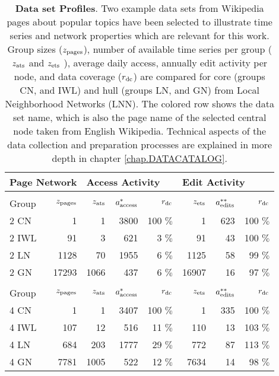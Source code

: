 \documentclass[a4paper,10pt]{scrbook}
\begin{document}
\begin{table}[h!]
 \begin{tabular}{|l|r||r|r|r||r|r|r|}
\hline
\multicolumn{2}{|l||}{\textbf{Page Network} } & \multicolumn{3}{l||}{\textbf{Access Activity}} & \multicolumn{3}{l|}{\textbf{Edit Activity}}  \\
\hline
\rowcolor{Yellow}
\multicolumn{8}{|c|}{\textbf{Formula One}} \\
\hline 
Group & $z_{\rm pages}$ & $ z_{\rm ats}$ & $a_{\rm access}^{\ast}$  & $r_{\rm dc}$ & $ z_{\rm ets}$ & $a_{\rm edits}^{\ast\ast}$ & $r_{\rm dc}$ \\
\hline 
2 CN & 1 & 1 & 3800 & 100 $\%$ & 1 & 623 & 100 $\%$	\\
2 IWL & 91 & 3 & 621 & 3 $\%$ & 91 & 43 & 100 $\%$	\\
2 LN & 1128 & 70 & 1955 & 6 $\%$ & 1125 & 58 & 99 $\%$	\\
2 GN & 17293 & 1066 & 437 & 6 $\%$ & 16907 & 16 & 97 $\%$	\\
\hline 
\rowcolor{Yellow}
\multicolumn{8}{|c|}{\textbf{Influenza}} \\
\hline 
Group & $z_{\rm pages}$ & $ z_{\rm ats}$ & $a_{\rm access}^{\ast}$  & $r_{\rm dc}$ & $ z_{\rm ets}$ & $a_{\rm edits}^{\ast\ast}$ & $r_{\rm dc}$ \\
\hline 
4 CN & 1 & 1 & 3407 & 100 $\%$ & 1 & 335 & 100 $\%$	\\
4 IWL & 107 & 12 & 516 & 11 $\%$ & 110 & 13 & 103 $\%$	\\
4 LN & 684 & 203 & 1777 & 29 $\%$ & 772 & 87 & 113 $\%$	\\
4 GN & 7781 & 1005 & 522 & 12 $\%$ & 7634 & 14 & 98 $\%$	\\
\hline 
\end{tabular}
\caption[\textbf{Data set Profiles}. Comparison of two example data sets. Pages of popular topics have been selected to illustrate time series and network properties.]{\textbf{Data set Profiles}. Two example data sets from Wikipedia pages about popular topics have been selected to illustrate time series and network properties which are relevant for this work. Group sizes ($z_{\rm pages}$), number of available time series per group ($z_{\rm ats}$ and $z_{\rm ets}$ ), average daily access, annually edit activity per node, and data coverage ($r_{\rm dc}$) are compared for core (groups CN, and IWL) and hull (groups LN, and GN) from Local Neighborhood Networks (LNN). The colored row shows the data set name, which is also the page name of the selected central node taken from English Wikipedia. Technical aspects of the data collection and preparation processes are explained in more depth in chapter \ref{chap.DATACATALOG}.}
\label{tab.example.datasets} 
\label{table.NNProperties}
\end{table}
\end{document}
